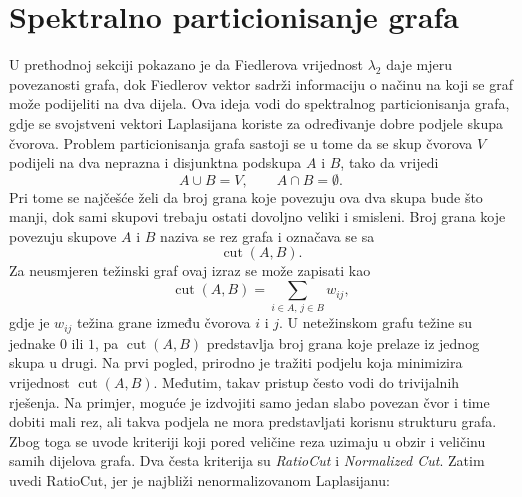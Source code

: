 \section{Spektralno particionisanje grafa}
U prethodnoj sekciji pokazano je da Fiedlerova vrijednost \(\lambda_2\) daje mjeru povezanosti grafa, dok Fiedlerov vektor sadrži informaciju o načinu na koji se graf može podijeliti na dva dijela. Ova ideja vodi do spektralnog particionisanja grafa, gdje se svojstveni vektori Laplasijana koriste za određivanje dobre podjele skupa čvorova.
Problem particionisanja grafa sastoji se u tome da se skup čvorova \(V\) podijeli na dva neprazna i disjunktna podskupa \(A\) i \(B\), tako da vrijedi
\[
    A \cup B = V, \qquad A \cap B = \emptyset.
\]
Pri tome se najčešće želi da broj grana koje povezuju ova dva skupa bude što manji, dok sami skupovi trebaju ostati dovoljno veliki i smisleni.
Broj grana koje povezuju skupove \(A\) i \(B\) naziva se rez grafa i označava se sa
\[
    \operatorname{cut}(A,B).
\]
Za neusmjeren težinski graf ovaj izraz se može zapisati kao
\[
    \operatorname{cut}(A,B)
    =
    \sum_{i\in A,\,j\in B} w_{ij},
\]
gdje je \(w_{ij}\) težina grane između čvorova \(i\) i \(j\). U netežinskom grafu težine su jednake \(0\) ili \(1\), pa \(\operatorname{cut}(A,B)\) predstavlja broj grana koje prelaze iz jednog skupa u drugi.
Na prvi pogled, prirodno je tražiti podjelu koja minimizira vrijednost \(\operatorname{cut}(A,B)\). Međutim, takav pristup često vodi do trivijalnih rješenja. Na primjer, moguće je izdvojiti samo jedan slabo povezan čvor i time dobiti mali rez, ali takva podjela ne mora predstavljati korisnu strukturu grafa.
Zbog toga se uvode kriteriji koji pored veličine reza uzimaju u obzir i veličinu samih dijelova grafa. Dva česta kriterija su \textit{RatioCut} i \textit{Normalized Cut}.
Zatim uvedi RatioCut, jer je najbliži nenormalizovanom Laplasijanu:
